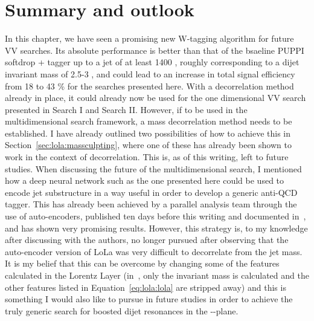 \section{Summary and outlook}
\label{sec:lola:outlook}
In this chapter, we have seen a promising new W-tagging algorithm for future VV searches. Its absolute performance is better than that of the bsaeline PUPPI softdrop + \nsubj tagger up to a jet \PT of at least 1400 \GeV, roughly corresponding to a dijet invariant mass of 2.5-3 \TeV, and could lead to an increase in total signal efficiency from 18 to 43 \% for the searches presented here. With a \PT decorrelation method already in place, it could already now be used for the one dimensional VV search presented in Search I and Search II. However, if to be used in the multidimensional search framework, a mass decorrelation method needs to be established. I have already outlined two possibilities of how to achieve this in Section~\ref{sec:lola:massculpting}, where one of these has already been shown to work in the context of \PT decorrelation. This is, as of this writing, left to future studies.
\newline
\newline
When discussing the future of the multidimensional search, I mentioned how a deep neural network such as the one presented here could be used to encode jet substructure in a way useful in order to develop a generic anti-QCD tagger. This has already been achieved by a parallel analysis team through the use of auto-encoders, published ten days before this writing and documented in~\cite{Heimel:2018mkt}, and has shown very promising results. However, this strategy is, to my knowledge after discussing with the authors, no longer pursued after observing that the auto-encoder version of LoLa was very difficult to decorrelate from the jet mass. It is my belief that this can be overcome by changing some of the features calculated in the Lorentz Layer (in~\cite{Heimel:2018mkt}, only the invariant mass is calculated and the other features listed in Equation~\ref{eq:lola:lola} are stripped away) and this is something I would also like to pursue in future studies in order to achieve the truly generic search for boosted dijet resonances in the \MJO-\MJT-\MVV plane.
